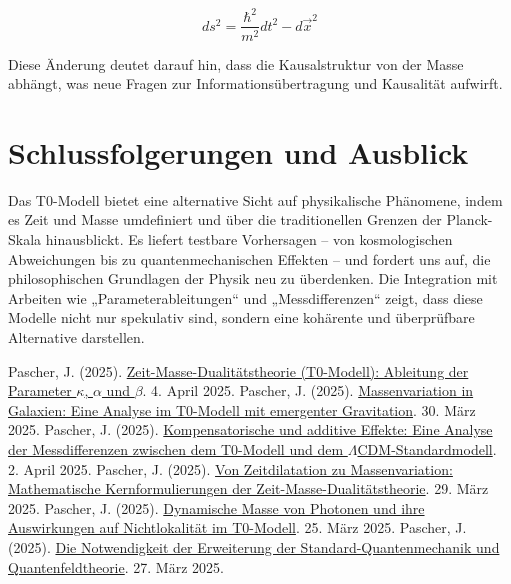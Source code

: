 \documentclass[a4paper,12pt]{article}
\begin{document}
	\begin{equation}
		ds^2 = \frac{\hbar^2}{m^2} dt^2 - d\vec{x}^2
	\end{equation}
	
	Diese Änderung deutet darauf hin, dass die Kausalstruktur von der Masse abhängt, was neue Fragen zur Informationsübertragung und Kausalität aufwirft.
	
	\section{Schlussfolgerungen und Ausblick}
	
	Das T0-Modell bietet eine alternative Sicht auf physikalische Phänomene, indem es Zeit und Masse umdefiniert und über die traditionellen Grenzen der Planck-Skala hinausblickt. Es liefert testbare Vorhersagen – von kosmologischen Abweichungen bis zu quantenmechanischen Effekten – und fordert uns auf, die philosophischen Grundlagen der Physik neu zu überdenken. Die Integration mit Arbeiten wie „Parameterableitungen“ \cite{pascher_params_2025} und „Messdifferenzen“ \cite{pascher_messdifferenzen_2025} zeigt, dass diese Modelle nicht nur spekulativ sind, sondern eine kohärente und überprüfbare Alternative darstellen.
	
	\begin{thebibliography}{99}
		 Pascher, J. (2025). \href{https://github.com/jpascher/T0-Time-Mass-Duality/tree/main/2/pdf/Deutsch/ZeitMasseT0Params.pdf}{Zeit-Masse-Dualitätstheorie (T0-Modell): Ableitung der Parameter \(\kappa\), \(\alpha\) und \(\beta\)}. 4. April 2025.
		 Pascher, J. (2025). \href{https://github.com/jpascher/T0-Time-Mass-Duality/tree/main/2/pdf/Deutsch/MassVarGalaxien.pdf}{Massenvariation in Galaxien: Eine Analyse im T0-Modell mit emergenter Gravitation}. 30. März 2025.
		 Pascher, J. (2025). \href{https://github.com/jpascher/T0-Time-Mass-Duality/tree/main/2/pdf/Deutsch/MessdifferenzenT0Standard.pdf}{Kompensatorische und additive Effekte: Eine Analyse der Messdifferenzen zwischen dem T0-Modell und dem \(\Lambda\)CDM-Standardmodell}. 2. April 2025.
		 Pascher, J. (2025). \href{https://github.com/jpascher/T0-Time-Mass-Duality/tree/main/2/pdf/Deutsch/MathZeitMasseLagrange.pdf}{Von Zeitdilatation zu Massenvariation: Mathematische Kernformulierungen der Zeit-Masse-Dualitätstheorie}. 29. März 2025.
		 Pascher, J. (2025). \href{https://github.com/jpascher/T0-Time-Mass-Duality/tree/main/2/pdf/Deutsch/DynMassePhotonenNichtlokal.pdf}{Dynamische Masse von Photonen und ihre Auswirkungen auf Nichtlokalität im T0-Modell}. 25. März 2025.
		 Pascher, J. (2025). \href{https://github.com/jpascher/T0-Time-Mass-Duality/tree/main/2/pdf/Deutsch/NotwendigkeitQMErweiterung.pdf}{Die Notwendigkeit der Erweiterung der Standard-Quantenmechanik und Quantenfeldtheorie}. 27. März 2025.
	\end{thebibliography}
	
\end{document}
